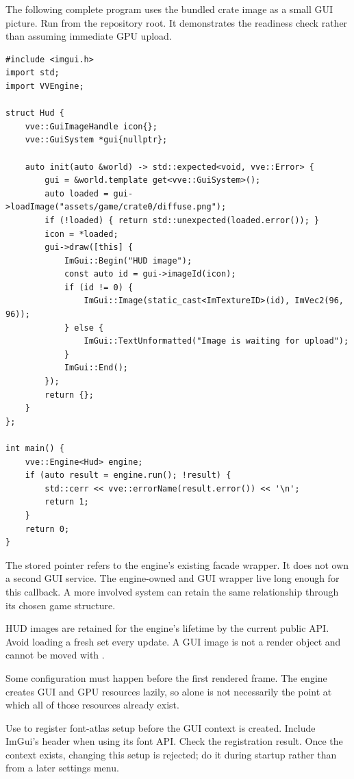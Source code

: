 \documentclass[11pt,a4paper]{article}
\begin{document}
The following complete program uses the bundled crate image as a small GUI picture. Run from the repository root. It demonstrates the readiness check rather than assuming immediate GPU upload.
\begin{lstlisting}
#include <imgui.h>
import std;
import VVEngine;

struct Hud {
    vve::GuiImageHandle icon{};
    vve::GuiSystem *gui{nullptr};

    auto init(auto &world) -> std::expected<void, vve::Error> {
        gui = &world.template get<vve::GuiSystem>();
        auto loaded = gui->loadImage("assets/game/crate0/diffuse.png");
        if (!loaded) { return std::unexpected(loaded.error()); }
        icon = *loaded;
        gui->draw([this] {
            ImGui::Begin("HUD image");
            const auto id = gui->imageId(icon);
            if (id != 0) {
                ImGui::Image(static_cast<ImTextureID>(id), ImVec2(96, 96));
            } else {
                ImGui::TextUnformatted("Image is waiting for upload");
            }
            ImGui::End();
        });
        return {};
    }
};

int main() {
    vve::Engine<Hud> engine;
    if (auto result = engine.run(); !result) {
        std::cerr << vve::errorName(result.error()) << '\n';
        return 1;
    }
    return 0;
}
\end{lstlisting}
The stored pointer refers to the engine's existing facade wrapper. It does not own a second GUI service. The engine-owned  and GUI wrapper live long enough for this callback. A more involved system can retain the same relationship through its chosen game structure.

HUD images are retained for the engine's lifetime by the current public API. Avoid loading a fresh set every update. A GUI image is not a render object and cannot be moved with .

Some configuration must happen before the first rendered frame. The engine creates GUI and GPU resources lazily, so  alone is not necessarily the point at which all of those resources already exist.

Use  to register font-atlas setup before the GUI context is created. Include ImGui's header when using its font API. Check the registration result. Once the context exists, changing this setup is rejected; do it during startup rather than from a later settings menu.
\end{document}
